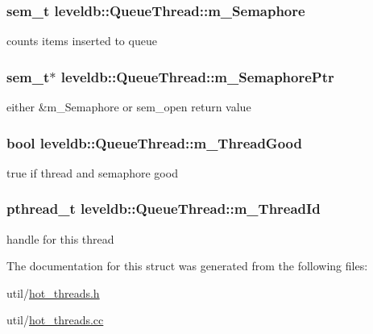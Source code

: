 \subsubsection[{m\+\_\+\+Semaphore}]{\setlength{\rightskip}{0pt plus 5cm}sem\+\_\+t leveldb\+::\+Queue\+Thread\+::m\+\_\+\+Semaphore}\label{structleveldb_1_1_queue_thread_a697f7c0aaeb5e776cf1de59476ec2005}


counts items inserted to queue 

\hypertarget{structleveldb_1_1_queue_thread_a0dc37975600c8018e85f7d7edfebccd7}{}
\subsubsection[{m\+\_\+\+Semaphore\+Ptr}]{\setlength{\rightskip}{0pt plus 5cm}sem\+\_\+t$\ast$ leveldb\+::\+Queue\+Thread\+::m\+\_\+\+Semaphore\+Ptr}\label{structleveldb_1_1_queue_thread_a0dc37975600c8018e85f7d7edfebccd7}


either \&m\+\_\+\+Semaphore or sem\+\_\+open return value 

\hypertarget{structleveldb_1_1_queue_thread_afa80b76fb1ae354d8b1123f7f1c2a171}{}
\subsubsection[{m\+\_\+\+Thread\+Good}]{\setlength{\rightskip}{0pt plus 5cm}bool leveldb\+::\+Queue\+Thread\+::m\+\_\+\+Thread\+Good}\label{structleveldb_1_1_queue_thread_afa80b76fb1ae354d8b1123f7f1c2a171}


true if thread and semaphore good 

\hypertarget{structleveldb_1_1_queue_thread_aea8d3c3f7c5d97e2b72e8500ba02a716}{}
\subsubsection[{m\+\_\+\+Thread\+Id}]{\setlength{\rightskip}{0pt plus 5cm}pthread\+\_\+t leveldb\+::\+Queue\+Thread\+::m\+\_\+\+Thread\+Id}\label{structleveldb_1_1_queue_thread_aea8d3c3f7c5d97e2b72e8500ba02a716}


handle for this thread 



The documentation for this struct was generated from the following files\+:\begin{DoxyCompactItemize}
\item 
util/\hyperlink{hot__threads_8h}{hot\+\_\+threads.\+h}\item 
util/\hyperlink{hot__threads_8cc}{hot\+\_\+threads.\+cc}\end{DoxyCompactItemize}
